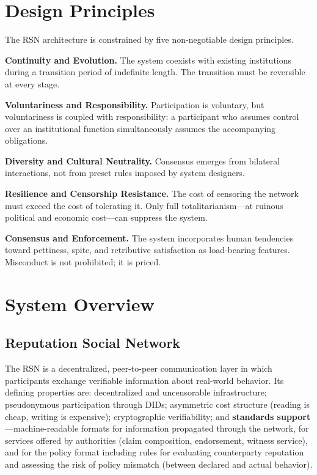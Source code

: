 \documentclass[11pt,a4paper,twocolumn]{article}
\begin{document}
\section{Design Principles}

The RSN architecture is constrained by five non-negotiable design principles.

\textbf{Continuity and Evolution.} The system coexists with existing institutions during a transition period of indefinite length. The transition must be reversible at every stage.

\textbf{Voluntariness and Responsibility.} Participation is voluntary, but voluntariness is coupled with responsibility: a participant who assumes control over an institutional function simultaneously assumes the accompanying obligations.

\textbf{Diversity and Cultural Neutrality.} Consensus emerges from bilateral interactions, not from preset rules imposed by system designers.

\textbf{Resilience and Censorship Resistance.} The cost of censoring the network must exceed the cost of tolerating it. Only full totalitarianism---at ruinous political and economic cost---can suppress the system.

\textbf{Consensus and Enforcement.} The system incorporates human tendencies toward pettiness, spite, and retributive satisfaction as load-bearing features. Misconduct is not prohibited; it is priced.

\section{System Overview}

\subsection{Reputation Social Network}

The RSN is a decentralized, peer-to-peer communication layer in which participants exchange verifiable information about real-world behavior. Its defining properties are: decentralized and uncensorable infrastructure; pseudonymous participation through DIDs; asymmetric cost structure (reading is cheap, writing is expensive); cryptographic verifiability; and \textbf{standards support}---machine-readable formats for information propagated through the network, for services offered by authorities (claim composition, endorsement, witness service), and for the policy format including rules for evaluating counterparty reputation and assessing the risk of policy mismatch (between declared and actual behavior).
\end{document}
